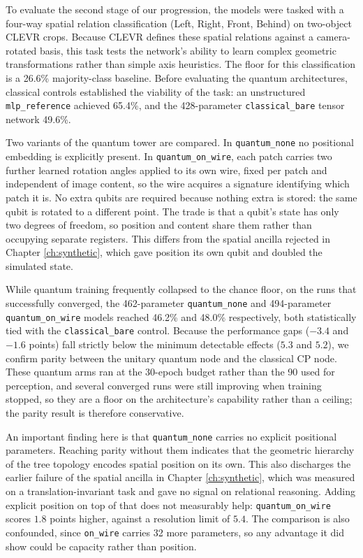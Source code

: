 \documentclass[12pt, a4paper, oneside]{report}
\begin{document}
To evaluate the second stage of our progression, the models were tasked with a four-way spatial relation classification (Left, Right, Front, Behind) on two-object CLEVR crops. Because CLEVR defines these spatial relations against a camera-rotated basis, this task tests the network's ability to learn complex geometric transformations rather than simple axis heuristics. The floor for this classification is a 26.6\% majority-class baseline. Before evaluating the quantum architectures, classical controls established the viability of the task: an unstructured \texttt{mlp\_reference} achieved 65.4\%, and the 428-parameter \texttt{classical\_bare} tensor network 49.6\%.

Two variants of the quantum tower are compared. In \texttt{quantum\_none} no positional embedding is explicitly present. In \texttt{quantum\_on\_wire}, each patch carries two further learned rotation angles applied to its own wire, fixed per patch and independent of image content, so the wire acquires a signature identifying which patch it is. No extra qubits are required because nothing extra is stored: the same qubit is rotated to a different point. The trade is that a qubit's state has only two degrees of freedom, so position and content share them rather than occupying separate registers. This differs from the spatial ancilla rejected in Chapter \ref{ch:synthetic}, which gave position its own qubit and doubled the simulated state.

While quantum training frequently collapsed to the chance floor, on the runs that successfully converged, the 462-parameter \texttt{quantum\_none} and 494-parameter \texttt{quantum\_on\_wire} models reached 46.2\% and 48.0\% respectively, both statistically tied with the \texttt{classical\_bare} control. Because the performance gaps ($-3.4$ and $-1.6$ points) fall strictly below the minimum detectable effects ($5.3$ and $5.2$), we confirm parity between the unitary quantum node and the classical CP node. These quantum arms ran at the 30-epoch budget rather than the 90 used for perception, and several converged runs were still improving when training stopped, so they are a floor on the architecture's capability rather than a ceiling; the parity result is therefore conservative.

An important finding here is that \texttt{quantum\_none} carries no explicit positional parameters. Reaching parity without them indicates that the geometric hierarchy of the tree topology encodes spatial position on its own. This also discharges the earlier failure of the spatial ancilla in Chapter \ref{ch:synthetic}, which was measured on a translation-invariant task and gave no signal on relational reasoning. Adding explicit position on top of that does not measurably help: \texttt{quantum\_on\_wire} scores $1.8$ points higher, against a resolution limit of $5.4$. The comparison is also confounded, since \texttt{on\_wire} carries 32 more parameters, so any advantage it did show could be capacity rather than position.
\end{document}
